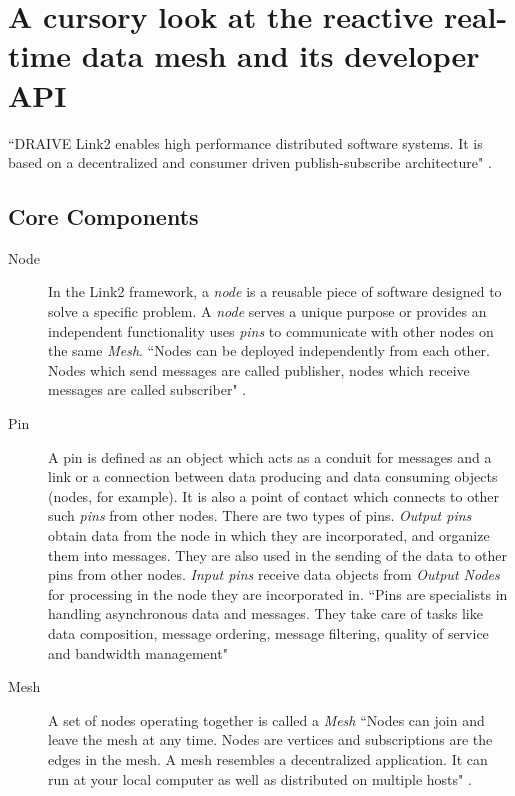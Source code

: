 \documentclass[a4paper, 12pt, oneside]{report}
\begin{document}
  \newpage
  
  
  \chapter{A cursory look at the reactive real-time data mesh and its developer API}
  
  \normalsize ``DRAIVE Link2 enables high performance distributed software systems. It is based on a decentralized and consumer driven publish-subscribe architecture" \cite{ReactiveMeshforRealtimeDataProcessingDRAIVELinkDocumentation-2019-12-09}.
  
     
  \section{Core Components}
  \begin{description}
  	
  	\item [Node] In the Link2 \cite{ReactiveMeshforRealtimeDataProcessingDRAIVELinkDocumentation-2019-12-09} framework, a \textit{node} is a reusable piece of software designed to solve a specific problem. A \textit{node} serves a unique purpose or provides an independent functionality uses \textit{pins} to communicate with other nodes on the same \textit{Mesh}. ``Nodes can be deployed independently from each other. Nodes which send messages are called publisher, nodes which receive messages are called subscriber" \cite{CorecomponentsDRAIVELinkDocumentation-2019-12-09}.
  
	\item [Pin] A pin is defined as an object which acts as a conduit for messages and a link or a connection between data producing and data consuming objects (nodes, for example). It is also a point of contact which connects to other such \textit{pins} from other nodes. There are two types of pins.	
	\textit{Output pins} obtain data from the node in which they are incorporated, and organize them into messages. They are also used in the sending of the data to other pins from other nodes. \textit{Input pins} receive data objects from \textit{Output Nodes} for processing in the node they are incorporated in. ``Pins are specialists in handling asynchronous data and messages. They take care of tasks like data composition, message ordering, message filtering, quality of service and bandwidth management" \cite{CorecomponentsDRAIVELinkDocumentation-2019-12-09}
	
	\item [Mesh] A set of nodes operating together is called a \textit{Mesh} ``Nodes can join and leave the mesh at any time. Nodes are vertices and subscriptions are the edges in the mesh. A mesh resembles a decentralized application. It can run at your local computer as well as distributed on multiple hosts" \cite{CorecomponentsDRAIVELinkDocumentation-2019-12-09}.


\end{description}
\end{document}
